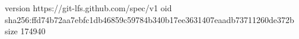 version https://git-lfs.github.com/spec/v1
oid sha256:ffd74b72aa7ebfc1db46859c59784b340b17ee3631407eaadb73711260de372b
size 174940
